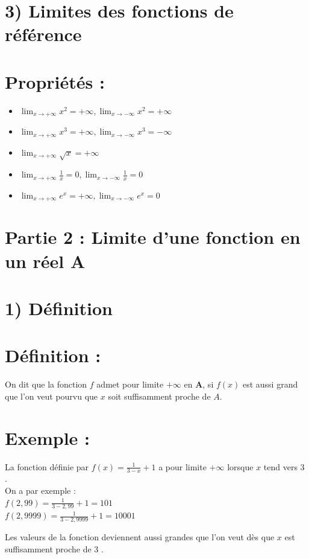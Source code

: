 \documentclass[10pt]{article}
\begin{document}
\section*{3) Limites des fonctions de référence}
\section*{Propriétés :}
\begin{itemize}
  \item $\lim _{x \rightarrow+\infty} x^{2}=+\infty, \lim _{x \rightarrow-\infty} x^{2}=+\infty$
  \item $\lim _{x \rightarrow+\infty} x^{3}=+\infty, \lim _{x \rightarrow-\infty} x^{3}=-\infty$
  \item $\lim _{x \rightarrow+\infty} \sqrt{x}=+\infty$
  \item $\lim _{x \rightarrow+\infty} \frac{1}{x}=0, \lim _{x \rightarrow-\infty} \frac{1}{x}=0$
  \item $\lim _{x \rightarrow+\infty} e^{x}=+\infty, \lim _{x \rightarrow-\infty} e^{x}=0$
\end{itemize}

\section*{Partie 2 : Limite d'une fonction en un réel A}
\section*{1) Définition}
\section*{Définition :}
On dit que la fonction $f$ admet pour limite $+\infty$ en $\boldsymbol{A}$, si $f(x)$ est aussi grand que l'on veut pourvu que $x$ soit suffisamment proche de $A$.

\section*{Exemple :}
La fonction définie par $f(x)=\frac{1}{3-x}+1$ a pour limite $+\infty$ lorsque $x$ tend vers 3 .\\
On a par exemple :\\
$f(2,99)=\frac{1}{3-2,99}+1=101$\\
$f(2,9999)=\frac{1}{3-2,9999}+1=10001$

Les valeurs de la fonction deviennent aussi grandes que l'on veut dès que $x$ est suffisamment proche de 3 .
\end{document}

